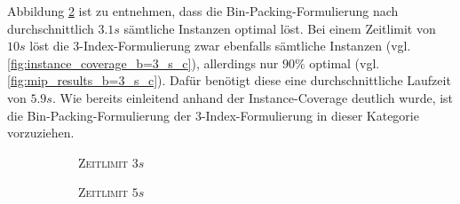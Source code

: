 Abbildung \ref{fig:mip_results_b=3_s_b} ist zu entnehmen, dass die Bin-Packing-Formulierung nach durchschnittlich
$3.1s$ sämtliche Instanzen optimal löst. Bei einem Zeitlimit von $10s$ löst die 3-Index-Formulierung zwar ebenfalls
sämtliche Instanzen (vgl. \ref{fig:instance_coverage_b=3_s_c}), allerdings nur $90 \%$ optimal (vgl. \ref{fig:mip_results_b=3_s_c}). Dafür benötigt diese eine durchschnittliche Laufzeit von $5.9s$.
Wie bereits einleitend anhand der Instance-Coverage deutlich wurde, ist die Bin-Packing-Formulierung der 3-Index-Formulierung in dieser Kategorie vorzuziehen.

\begin{figure}[H]
\centering
\begin{subfigure}[b]{0.3\textwidth}
\centering
{}
\caption{\textsc{Zeitlimit} $3s$}
\label{fig:mip_results_b=3_s_a}
\end{subfigure}
\begin{subfigure}[b]{0.3\textwidth}
\centering
{}
\caption{\textsc{Zeitlimit} $5s$}
\label{fig:mip_results_b=3_s_b}
\end{subfigure}
\begin{subfigure}[b]{0.3\textwidth}

\end{subfigure}
\end{figure}
